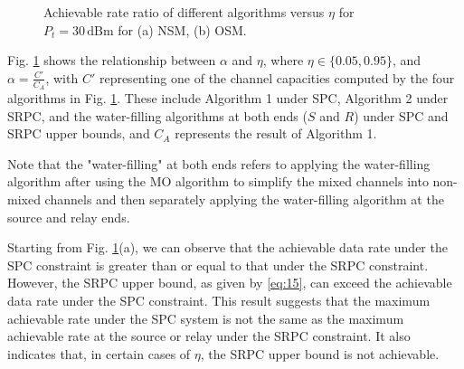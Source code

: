 \documentclass[lettersize,journal]{IEEEtran}
\begin{document}
	
	
	\begin{figure}[!t]
		\centering
		\hfil
		\caption{Achievable rate ratio of different algorithms versus \( \eta \) for \( P_t = 30 \, \text{dBm} \) for (a) NSM, (b) OSM.}
		\label{fig_eta_all}
	\end{figure}
	
	Fig. \ref{fig_eta_all} shows the relationship between \( \alpha \) and \( \eta \), where \( \eta \in \{0.05, 0.95\} \), and \( \alpha = \frac{C'}{C_A} \), with \( C' \) representing one of the channel capacities computed by the four algorithms in Fig. \ref{fig_eta_all}. These include Algorithm 1 under SPC, Algorithm 2 under SRPC, and the water-filling algorithms at both ends (\(S\) and \(R\)) under SPC and SRPC upper bounds, and \( C_A \) represents the result of Algorithm 1.
	
	
	Note that the "water-filling" at both ends refers to applying the water-filling algorithm after using the MO algorithm to simplify the mixed channels into non-mixed channels and then separately applying the water-filling algorithm at the source and relay ends.
	
	Starting from Fig.  \ref{fig_eta_all}(a), we can observe that the achievable data rate under the SPC constraint is greater than or equal to that under the SRPC constraint. However, the SRPC upper bound, as given by \eqref{eq:15}, can exceed the achievable data rate under the SPC constraint. This result suggests that the maximum achievable rate under the SPC system is not the same as the maximum achievable rate at the source or relay under the SRPC constraint. It also indicates that, in certain cases of \( \eta \), the SRPC upper bound is not achievable.
	
\end{document}
